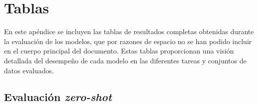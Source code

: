 
\chapter{Tablas}
\label{ch:Tablas}

\noindent En este apéndice se incluyen las tablas de resultados completas obtenidas durante la evaluación de los modelos, que por razones de espacio no se han podido incluir en el cuerpo principal del documento. Estas tablas proporcionan una visión detallada del desempeño de cada modelo en las diferentes tareas y conjuntos de datos evaluados.


\section{Evaluación \textit{zero-shot}}

